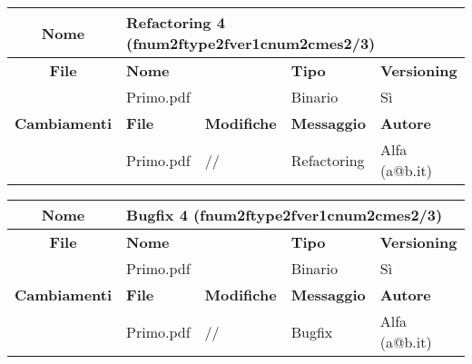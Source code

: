 
\begin{table}[ht]
\footnotesize
\begin{tabular}{|c|p{2.5cm}|p{2cm}|p{2.5cm}|p{2.5cm}|}
  \hline
  \textbf{Nome}	& \multicolumn{4}{l|}{Refactoring 4 (fnum2ftype2fver1cnum2cmes2/3)}									\\
  \hline
  \rowcolor{lightgray}\textbf{File} 		& \multicolumn{2}{l|}{\textbf{Nome}}		& \textbf{Tipo}		& \textbf{Versioning} 		\\
						\cline{2-5}
						& \multicolumn{2}{l|}{Primo.pdf}		& Binario		& Sì				\\
  \hline
  \rowcolor{lightgray}\textbf{Cambiamenti}	& \textbf{File}		&\textbf{Modifiche}	& \textbf{Messaggio}	& \textbf{Autore}		\\
						\cline{2-5}
						& Primo.pdf		& //	 		& Refactoring		& Alfa (a@b.it)			\\
						
  \hline
\end{tabular}
\end{table}

\begin{table}[ht]
\footnotesize
\begin{tabular}{|c|p{2.5cm}|p{2cm}|p{2.5cm}|p{2.5cm}|}
  \hline
  \textbf{Nome}	& \multicolumn{4}{l|}{Bugfix 4 (fnum2ftype2fver1cnum2cmes2/3)}										\\
  \hline
  \rowcolor{lightgray}\textbf{File} 		& \multicolumn{2}{l|}{\textbf{Nome}}		& \textbf{Tipo}		& \textbf{Versioning} 		\\
						\cline{2-5}
						& \multicolumn{2}{l|}{Primo.pdf}		& Binario		& Sì				\\
  \hline
  \rowcolor{lightgray}\textbf{Cambiamenti}	& \textbf{File}		&\textbf{Modifiche}	& \textbf{Messaggio}	& \textbf{Autore}		\\
						\cline{2-5}
						& Primo.pdf		& //	 		& Bugfix		& Alfa (a@b.it)			\\
						
  \hline
\end{tabular}
\end{table}


